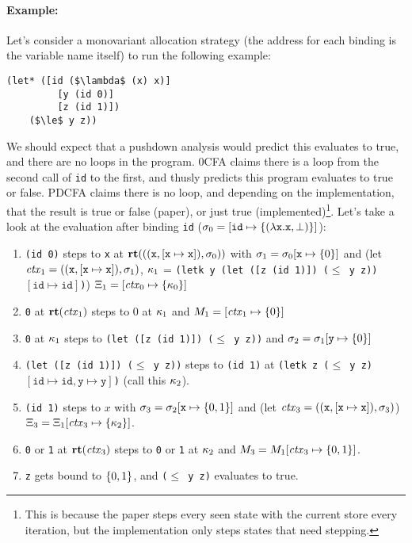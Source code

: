 \documentclass{llncs}
\begin{document}
\paragraph{Example:} Let's consider a monovariant allocation strategy
(the address for each binding is the variable name itself) to run the
following example:
\begin{lstlisting}[mathescape]
  (let* ([id ($\lambda$ (x) x)]
         [y (id 0)]
         [z (id 1)])
    ($\le$ y z))
\end{lstlisting}
We should expect that a pushdown analysis would predict this evaluates
to true, and there are no loops in the program. 0CFA claims there is a
loop from the second call of \texttt{id} to the first, and thusly
predicts this program evaluates to true or false. PDCFA claims there
is no loop, and depending on the implementation, that the result is
true or false (paper), or just true (implemented)\footnote{This is
  because the paper steps every seen state with the current store
  every iteration, but the implementation only steps states that need stepping.}. Let's take a look at the evaluation after binding
\texttt{id} ($\sigma_0 = [\texttt{id} \mapsto
\{ (\lambda{} \texttt{x}. \texttt{x}, \bot) \}]$):

\begin{enumerate}
\item{\texttt{(id 0)} steps to \texttt{x} at $\mathbf{rt}(((\texttt{x}, [\texttt{x}\mapsto\texttt{x}]), \sigma_0))$ with $\sigma_1 =
    \sigma_0[\texttt{x} \mapsto \{ 0 \}]$ and
    (let $\mathit{ctx}_1 = ((\texttt{x},[\texttt{x}\mapsto\texttt{x}]),\sigma_1)$,
         $\kappa_1$ = \texttt{(letk y (let ([z (id 1)]) ($\le$ y z)) $[\texttt{id}\mapsto{\texttt{id}}]$)})
    $\Xi_1 = [\mathit{ctx}_0 \mapsto \{ \kappa_0 \}]$}
\item{\texttt{0} at $\mathbf{rt}(\mathit{ctx}_1)$ steps to $0$ at $\kappa_1$ and $M_1 = [\mathit{ctx}_1 \mapsto \{ 0 \}]$}
\item{\texttt{0} at $\kappa_1$ steps to \texttt{(let ([z (id 1)]) ($\le$ y z))} and $\sigma_2 = \sigma_1[\texttt{y} \mapsto \{ 0 \}]$}
\item{\texttt{(let ([z (id 1)]) ($\le$ y z))} steps to \texttt{(id 1)} at \texttt{(letk z ($\le$ y z) $[\texttt{id} \mapsto \texttt{id}, \texttt{y} \mapsto \texttt{y}]$)} (call this $\kappa_2$).}
\item{\texttt{(id 1)} steps to $x$ with $\sigma_3 = \sigma_2[\texttt{x} \mapsto \{ 0,1 \}]$ and
      (let $\mathit{ctx}_3 = ((\texttt{x},[\texttt{x}\mapsto\texttt{x}]),\sigma_3)$) $\Xi_3 =\Xi_1[\mathit{ctx}_3 \mapsto \{ \kappa_2 \}]$.}
\item{\texttt{0} or \texttt{1} at $\mathbf{rt}(\mathit{ctx}_3)$ steps to \texttt{0} or \texttt{1} at $\kappa_2$ and $M_3 = M_1[\mathit{ctx}_3 \mapsto \{ 0,1 \}]$.}
\item{\texttt{z} gets bound to $\{ 0,1 \}$, and \texttt{($\le$ y z)} evaluates to true.}
\end{enumerate}
\end{document}
